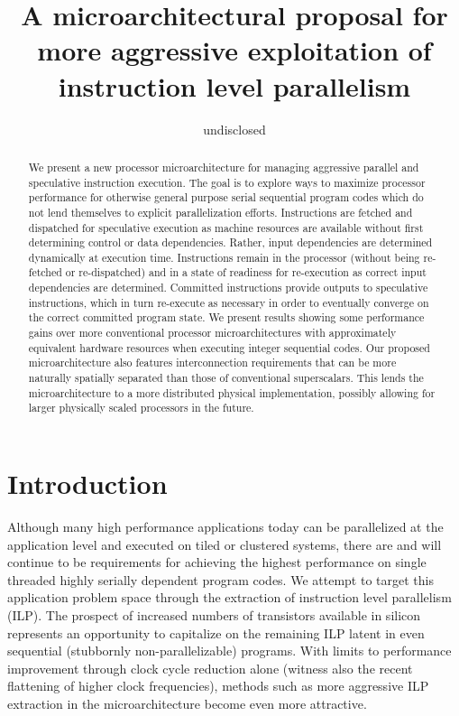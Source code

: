 \documentclass[10pt,dvips]{article}
\begin{document}
%
%
\title{A microarchitectural proposal for more aggressive 
exploitation of instruction level parallelism}
%
%
\author{
undisclosed
}
%
%
%
\maketitle
%
%
%
\begin{abstract}
%
We present a new processor microarchitecture for managing aggressive
parallel and speculative instruction execution.  The goal is to explore
ways to maximize processor performance for otherwise general purpose
serial sequential program codes which do not lend themselves to explicit
parallelization efforts.  Instructions are fetched and dispatched for
speculative execution as machine resources are available without first
determining control or data dependencies.  Rather, input dependencies are
determined dynamically at execution time.  Instructions remain in the
processor (without being re-fetched or re-dispatched) and in a state of
readiness for re-execution as correct input dependencies are determined.
Committed instructions provide outputs to speculative instructions, which
in turn re-execute as necessary in order to eventually converge on the
correct committed program state.  We present results showing some
performance gains
over more conventional processor microarchitectures with approximately
equivalent hardware resources when executing integer sequential codes.
Our proposed microarchitecture also features 
interconnection requirements that can be more naturally spatially
separated than those of conventional superscalars.
This lends the microarchitecture to a more
distributed physical implementation, possibly allowing
for larger physically scaled processors in the future.
%
\end{abstract}
%
%
\vspace{-0.15in}
\section{Introduction}
%
Although many high performance applications today
can be parallelized at the application level 
and executed on tiled or clustered systems,
there are and will continue
to be requirements for achieving the highest performance
on single threaded highly serially dependent program codes.
We attempt to target this application problem space
through the extraction of instruction level parallelism (ILP).
The prospect of increased numbers of transistors 
available in silicon represents an opportunity to capitalize on
the remaining ILP latent in even sequential (stubbornly non-parallelizable)
programs.
With limits to performance improvement through clock cycle reduction
alone (witness also the recent flattening of higher clock frequencies),
methods such as more aggressive ILP extraction in the microarchitecture
become even more attractive.
\end{document}

